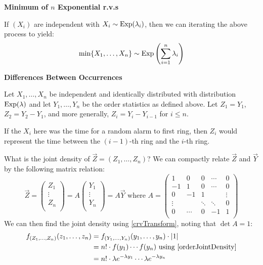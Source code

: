 \documentclass[../main.tex]{subfiles}
\begin{document}
\textbf{Minimum of $n$ Exponential r.v.s}\par
If $(X_i)$ are independent with $X_i \sim \operatorname{Exp}(\lambda_i)$, then we can iterating the above process to yield:
\begin{equation}
  \min\{X_1, \ldots, X_n\} \sim \operatorname{Exp}\left(\sum_{i = 1}^{n} \lambda_i\right) \label{expMin}
\end{equation}

\textbf{Differences Between Occurrences}\par
Let $X_1, \ldots, X_n$ be independent and identically distributed with distribution $\operatorname{Exp}(\lambda)$ and let $Y_1, \ldots, Y_n$ be the order statistics as defined above.
Let $Z_1 = Y_1$, $Z_2 = Y_2 - Y_1$, and more generally, $Z_i = Y_i - Y_{i - 1}$ for $i \leq n$.
\begin{remark}[Intuition]
  If the $X_i$ here was the time for a random alarm to first ring, then $Z_i$ would represent the time between the $(i - 1)$-th ring and the $i$-th ring.
\end{remark}
What is the joint density of $\vec{Z} = (Z_1, \ldots, Z_n)$?
We can compactly relate $\vec{Z}$ and $\vec{Y}$ by the following matrix relation:
\[
  \vec{Z} = \begin{pmatrix}
  Z_1 \\
  \vdots \\
  Z_n \\
  \end{pmatrix} = A \begin{pmatrix}
  Y_1 \\
  \vdots \\
  Y_n \\
  \end{pmatrix} = A\vec{Y} \text{ where } A = \begin{pmatrix}
  1 & 0 & 0 & \cdots & 0 \\
  -1 & 1 & 0 & \cdots & 0 \\
  0 & -1 & 1 &  & \vdots \\
  \vdots &  & \ddots & \ddots & 0 \\
  0 & \cdots & 0 & -1 & 1 \\
  \end{pmatrix}
\]
We can then find the joint density using \cref{crvTransform}, noting that $\det A = 1$:
\begin{align*}
  f_{(Z_1, \ldots, Z_n)}(z_1, \ldots, z_n) &= f_{(Y_1, \ldots, Y_n)}(y_1, \ldots, y_n) \cdot |1| \\
                                           &= n! \cdot f(y_1) \cdots f(y_n) \text{ using \cref{orderJointDensity}} \\
                                           &= n! \cdot \lambda e^{-\lambda y_1} \cdots \lambda e^{-\lambda y_n}
\end{align*}
\end{document}
